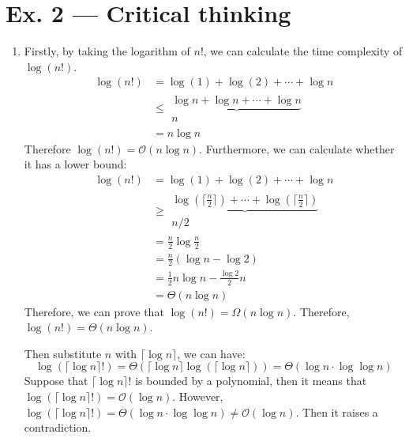 \documentclass[12pt, a4paper]{article}
\begin{document}
\section*{Ex. 2 --- Critical thinking}
\begin{enumerate}
    \item Firstly, by taking the logarithm of $n!$, we can calculate the time complexity of $\log(n!)$.
          \begin{align*}
              \log(n!) &= \log(1) + \log(2) + \cdots + \log n\\
                       &\leq \begin{matrix}
                           \underbrace{\log n + \log n + \cdots + \log n}\\ n
                       \end{matrix}\\
                       &= n\log n
          \end{align*}
          Therefore $\log(n!) = \mathcal{O}(n\log n)$. Furthermore, we can calculate whether it has a lower bound:
          \begin{align*}
              \log(n!) &= \log(1) + \log(2) + \cdots + \log n\\
                       &\geq \begin{matrix}\underbrace{\log(\lceil \frac{n}{2} \rceil) + \cdots + \log(\lceil \frac{n}{2} \rceil)}\\ n/2 \end{matrix}\\
                       &= \frac{n}{2}\log \frac{n}{2}\\
                       &= \frac{n}{2}(\log n - \log 2)\\
                       &= \frac{1}{2}n\log n - \frac{\log 2}{2} n\\
                       &= \Theta(n\log n)
          \end{align*}
          Therefore, we can prove that $\log(n!) = \Omega(n\log n)$. Therefore, $\log(n!) = \Theta(n\log n)$. 
          
          Then substitute $n$ with $\lceil \log n \rceil$, we can have:
          $$\log(\lceil \log n \rceil !) = \Theta(\lceil \log n \rceil \log(\lceil \log n \rceil)) = \Theta(\log n \cdot \log \log n)$$
          Suppose that $\lceil \log n \rceil !$ is bounded by a polynomial, then it means that $\log(\lceil \log n \rceil !) = \mathcal{O}(\log n)$. 
          However, $\log(\lceil \log n \rceil !) = \Theta(\log n \cdot \log \log n) \neq \mathcal{O}(\log n)$. Then it raises a contradiction.
          

\end{enumerate}
\end{document}
